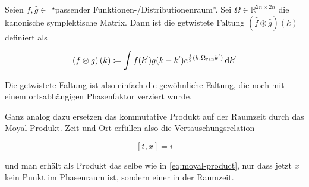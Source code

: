 \begin{definition}
\label{def:twisted_convolution}
    Seien $\hat f,\hat g \in $ "`passender Funktionen-/Distributionenraum"'. Sei $\Omega \in \mathbb{R}^{2n \times 2n}$ die kanonische symplektische Matrix. Dann ist die getwistete Faltung $(\hat f \circledast \hat g) (k)$ definiert als

    \begin{equation}
        (f \circledast g) \,(k) \coloneqq
        \int f(k') g(k-k')e^{\frac{i}{2} (k,\Omega_{\mathrm{can}} k')} \mathop{}\!\mathrm{d} k'
    \end{equation}

    Die getwistete Faltung ist also einfach die gewöhnliche Faltung, die noch mit einem ortsabhängigen Phasenfaktor verziert wurde.
\end{definition}

Ganz analog dazu ersetzen \textcite{Doplicher1995} das kommutative Produkt auf der Raumzeit durch das Moyal-Produkt. Zeit und Ort erfüllen also die Vertauschungsrelation

\begin{equation*}
    \left[t,x\right] = i
\end{equation*}

und man erhält als Produkt das selbe wie in \cref{eq:moyal-product}, nur dass jetzt $x$ kein Punkt im Phasenraum ist, sondern einer in der Raumzeit.






